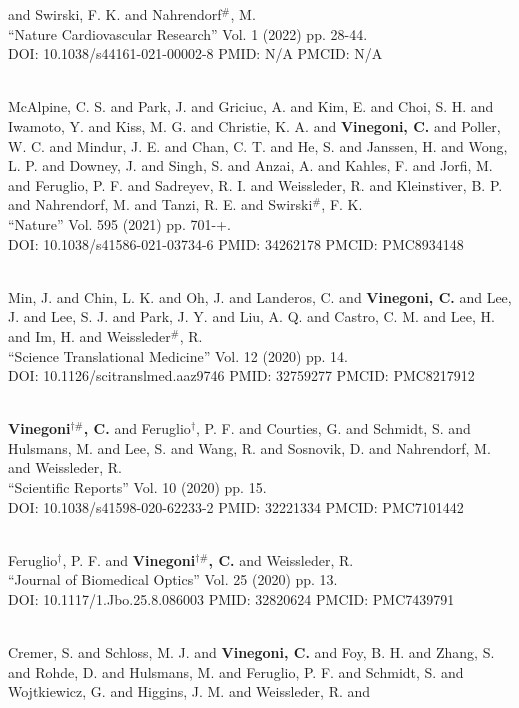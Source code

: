 and Swirski, F. K. and Nahrendorf$^\#$, M. \\ ``Nature Cardiovascular Research'' Vol. 1 (2022) pp. 28-44. \\ DOI: 10.1038/s44161-021-00002-8 PMID: N/A PMCID: N/A\item {} \\ McAlpine, C. S. and Park, J. and Griciuc, A. and Kim, E. and Choi, S. H. and Iwamoto, Y. and Kiss, M. G. and Christie, K. A. and {\bf Vinegoni, C.} and Poller, W. C. and Mindur, J. E. and Chan, C. T. and He, S. and Janssen, H. and Wong, L. P. and Downey, J. and Singh, S. and Anzai, A. and Kahles, F. and Jorfi, M. and Feruglio, P. F. and Sadreyev, R. I. and Weissleder, R. and Kleinstiver, B. P. and Nahrendorf, M. and Tanzi, R. E. and Swirski$^\#$, F. K. \\ ``Nature'' Vol. 595 (2021) pp. 701-+. \\ DOI: 10.1038/s41586-021-03734-6 PMID: 34262178 PMCID: PMC8934148\item {} \\ Min, J. and Chin, L. K. and Oh, J. and Landeros, C. and {\bf Vinegoni, C.} and Lee, J. and Lee, S. J. and Park, J. Y. and Liu, A. Q. and Castro, C. M. and Lee, H. and Im, H. and Weissleder$^\#$, R. \\ ``Science Translational Medicine'' Vol. 12 (2020) pp. 14. \\ DOI: 10.1126/scitranslmed.aaz9746 PMID: 32759277 PMCID: PMC8217912\item {} \\ {\bf Vinegoni$^{\dag \#}$, C.} and Feruglio$^\dag$, P. F. and Courties, G. and Schmidt, S. and Hulsmans, M. and Lee, S. and Wang, R. and Sosnovik, D. and Nahrendorf, M. and Weissleder, R. \\ ``Scientific Reports'' Vol. 10 (2020) pp. 15. \\ DOI: 10.1038/s41598-020-62233-2 PMID: 32221334 PMCID: PMC7101442\item {} \\ Feruglio$^\dag$, P. F. and {\bf Vinegoni$^{\dag \#}$, C.} and Weissleder, R. \\ ``Journal of Biomedical Optics'' Vol. 25 (2020) pp. 13. \\ DOI: 10.1117/1.Jbo.25.8.086003 PMID: 32820624 PMCID: PMC7439791\item {} \\ Cremer, S. and Schloss, M. J. and {\bf Vinegoni, C.} and Foy, B. H. and Zhang, S. and Rohde, D. and Hulsmans, M. and Feruglio, P. F. and Schmidt, S. and Wojtkiewicz, G. and Higgins, J. M. and Weissleder, R. and 